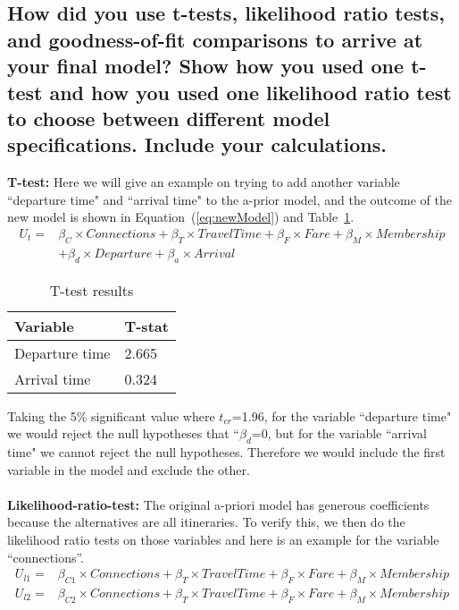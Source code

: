 \documentclass[11pt]{article}
\begin{document}
\subsection{\small{How did you use t-tests, likelihood ratio tests, and goodness-of-fit comparisons to arrive at your final model? Show how you used one t-test and how you used one likelihood ratio test to choose between different model specifications. Include your calculations.}}
\textbf{T-test:}
Here we will give an example on trying to add another variable ``departure time" and ``arrival time" to the a-prior model, and the outcome of the new model is shown in Equation~(\ref{eq:newModel}) and Table~\ref{tb:newModel}.
\begin{equation}\label{eq:newModel}
\begin{array}{ll}
U_{t}=&\beta_{C}\times Connections+\beta_T\times TravelTime+\beta_F\times Fare+\beta_M\times Membership\\
& +\beta_d\times Departure+\beta_a\times Arrival
\end{array}
\end{equation}
\vspace{-2.5em}
\begin{table}[H]
\centering
\caption{\label{tb:newModel}T-test results}
\vspace{5pt}
\begin{tabularx}{15cm}{|X|X|}
\hline
Variable & T-stat\\
\hline
Departure time & 2.665\\
\hline
Arrival time & 0.324\\
\hline
\end{tabularx}
\end{table}
\noindent Taking the 5\% significant value where $t_{cr}$=1.96, for the variable ``departure time" we would reject the null hypotheses that ``$\beta_d$=0, but for the variable ``arrival time" we cannot reject the null hypotheses. Therefore we would include the first variable in the model and exclude the other.\\\\
\textbf{Likelihood-ratio-test:}
The original a-priori model has generous coefficients because the alternatives are all itineraries. To verify this, we then do the likelihood ratio tests on those variables and here is an example for the variable ``connections”. 
\begin{equation}\label{eq:unrestrictedModel}
\begin{array}{ll}
U_{l1}=&\beta_{C1}\times Connections+\beta_T\times TravelTime+\beta_F\times Fare+\beta_M\times Membership\\
U_{l2}=&\beta_{C2}\times Connections+\beta_T\times TravelTime+\beta_F\times Fare+\beta_M\times  Membership
\end{array}
\end{equation}
\end{document}
